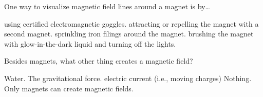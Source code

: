 \documentclass{exam}
\begin{document}
\begin{questions}





\question
One way to visualize magnetic field lines around a magnet is by\ldots 

\begin{randomizechoices}
\choice using certified electromagnetic goggles.
\choice attracting or repelling the magnet with a second magnet.
\CorrectChoice sprinkling iron filings around the magnet.
\choice brushing the magnet with glow-in-the-dark liquid and turning off the lights.
\end{randomizechoices}

\question
Besides magnets, what other thing creates a magnetic field?

\begin{randomizechoices}
\choice Water.
\choice The gravitational force.
\CorrectChoice electric current (i.e., moving charges)
\choice Nothing. Only magnets can create magnetic fields.
\end{randomizechoices}






\end{questions}
\end{document}

